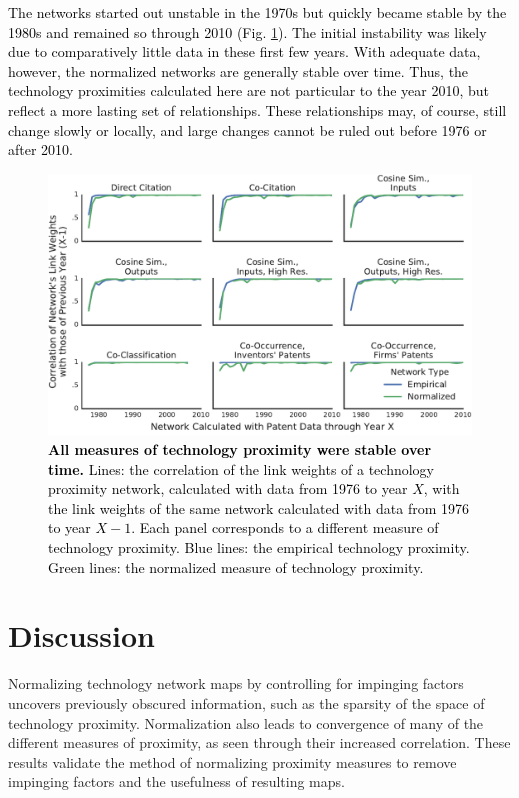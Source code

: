 \documentclass[]{svjour3}
\begin{document}
\textcolor{black}{The networks started out unstable in the 1970s but quickly became stable by the 1980s and remained so through 2010 (Fig. \ref{Network_Temporal_Stability}). The initial instability was likely due to comparatively little data in these first few years. With adequate data, however, the normalized networks are generally stable over time. Thus, the technology proximities calculated here are not particular to the year 2010, but reflect a more lasting set of relationships. These relationships may, of course, still change slowly or locally, and large changes cannot be ruled out before 1976 or after 2010.}


\begin{figure}[h!]
\centering
\includegraphics[width=\textwidth]{figs/Network_Temporal_Stability_IPC.pdf} 
\caption{\textcolor{black}{\textbf{All measures of technology proximity were stable over time.} Lines: the correlation of the link weights of a technology proximity network, calculated with data from 1976 to year $X$, with the link weights of the same network calculated with data from 1976 to year $X-1$. Each panel corresponds to a different measure of technology proximity. Blue lines: the empirical technology proximity. Green lines: the normalized measure of technology proximity. 
}}\label{Network_Temporal_Stability}
\end{figure}

\section{Discussion} 
Normalizing technology network maps by controlling for impinging factors uncovers previously obscured information, such as the sparsity of the space of technology proximity. Normalization also leads to convergence of many of the different measures of proximity, as seen through their increased correlation. These results validate the method of normalizing proximity measures to remove impinging factors and the usefulness of resulting maps. 
\end{document}
